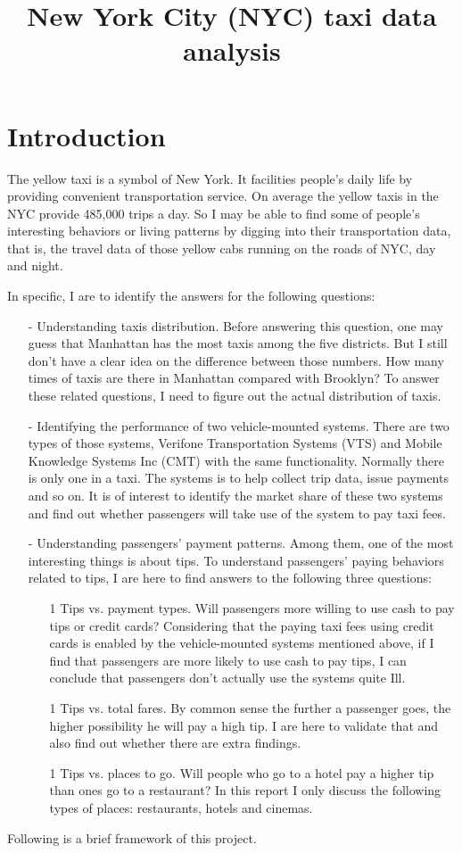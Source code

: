 \documentclass[a4paper]{article}
\title{New York City (NYC) taxi data analysis}
\begin{document}
\newcommand{\plotpath}{plots/}
\maketitle
\section{Introduction}

The yellow taxi is a symbol of New York. It facilities people's daily life by providing convenient transportation service. On average the yellow taxis in the NYC provide 485,000 trips a day. So I may be able to find some of people's interesting behaviors or living patterns by digging into their transportation data, that is, the travel data of those yellow cabs running on the roads of NYC, day and night. 

In specific, I are to identify the answers for the following questions:
\begin{itemize}
\item[-] Understanding taxis distribution. Before answering this question, one may guess that Manhattan has the most taxis among the five districts. But I still don't have a clear idea on the difference between those numbers. How many times of taxis are there in Manhattan compared with Brooklyn? To answer these related questions, I need to figure out the actual distribution of taxis.
\item[-] Identifying the performance of two vehicle-mounted systems. There are two types of those systems, Verifone Transportation Systems (VTS) and Mobile Knowledge Systems Inc (CMT) with the same functionality. Normally there is only one in a taxi. The systems is to help collect trip data, issue payments and so on. It is of interest to identify the market share of these two systems and find out whether passengers will take use of the system to pay taxi fees.
\item[-] Understanding passengers' payment patterns. Among them, one of the most interesting things is about tips. To understand passengers' paying behaviors related to tips, I are here to find answers to the following three questions:
  \begin{itemize}
  \item[1] Tips vs. payment types. Will passengers more willing to use cash to pay tips or credit cards? Considering that the paying taxi fees using credit cards is enabled by the vehicle-mounted systems mentioned above, if I find that passengers are more likely to use cash to pay tips, I can conclude that passengers don't actually use the systems quite Ill.
  \item[1] Tips vs. total fares. By common sense the further a passenger goes, the higher possibility he will pay a high tip. I are here to validate that and also find out whether there are extra findings.
  \item[1] Tips vs. places to go. Will people who go to a hotel pay a higher tip than ones go to a restaurant? In this report I only discuss the following types of places: restaurants, hotels and cinemas.
  \end{itemize}
\end{itemize}
Following is a brief framework of this project.
\end{document}
